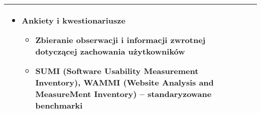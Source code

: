 \documentclass[../main.tex]{subfiles}
\begin{document}
\begin{table}[H]
\begin{center}
\begin{tabular}{| p{8cm} | p{8cm} |}
\begin{itemize}
                    \item \textbf{Ankiety i kwestionariusze}
                    \begin{itemize}
                        \item Zbieranie \textbf{obserwacji} i \textbf{informacji zwrotnej} dotyczącej zachowania użytkowników
                        \item \textbf{SUMI} (Software Usability Measurement Inventory), \textbf{WAMMI} (Website Analysis and MeasureMent Inventory)
                        – standaryzowane benchmarki
                    \end{itemize}
                \end{itemize}\\
                \hline
            \end{tabular}
        \end{center}
    \end{table}
\end{document}
